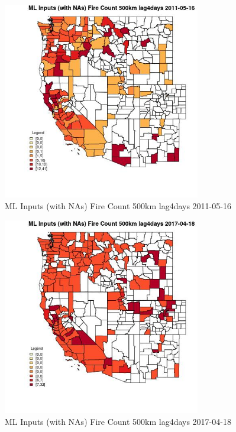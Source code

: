 \begin{figure} 
\centering  
\includegraphics[width=0.77\textwidth]{Code_Outputs/Report_ML_input_PM25_Step4_part_e_de_duplicated_aves_compiled_2019-05-20wNAs_CountyFire_Count_500km_lag4daysMean2011-05-16.jpg} 
\caption{\label{fig:Report_ML_input_PM25_Step4_part_e_de_duplicated_aves_compiled_2019-05-20wNAsCountyFire_Count_500km_lag4daysMean2011-05-16}ML Inputs (with NAs) Fire Count 500km lag4days 2011-05-16} 
\end{figure} 
 

\begin{figure} 
\centering  
\includegraphics[width=0.77\textwidth]{Code_Outputs/Report_ML_input_PM25_Step4_part_e_de_duplicated_aves_compiled_2019-05-20wNAs_CountyFire_Count_500km_lag4daysMean2017-04-18.jpg} 
\caption{\label{fig:Report_ML_input_PM25_Step4_part_e_de_duplicated_aves_compiled_2019-05-20wNAsCountyFire_Count_500km_lag4daysMean2017-04-18}ML Inputs (with NAs) Fire Count 500km lag4days 2017-04-18} 
\end{figure} 
 

